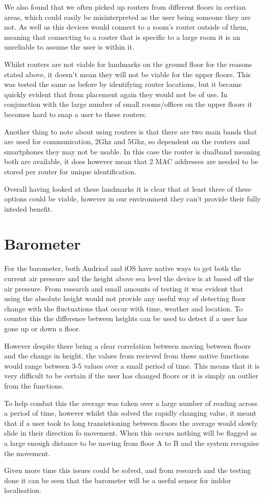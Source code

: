 \documentclass[main.tex]{subfiles}
\begin{document}
We also found that we often picked up routers from different floors in certian areas, which could easily be misinterpreted as the user being someone they are not. As well as this devices would connect to a room's router outside of them, meaning that connecting to a router that is specific to a large room it is an unreliable to assume the user is within it.

Whilst routers are not viable for landmarks on the ground floor for the reasons stated above, it doesn't mean they will not be viable for the upper floors. This was tested the same as before by identifying router locations, but it became quickly evident that from placement again they would not be of use. In conjunction with the large number of small rooms/offices on the upper floors it becomes hard to snap a user to these routers.

Another thing to note about using routers is that there are two main bands that are used for communication, 2Ghz and 5Ghz, so dependent on the routers and smartphones they may not be usable. In this case the router is dualband meaning both are available, it does however mean that 2 MAC addresses are needed to be stored per router for unique identification.

Overall having looked at these landmarks it is clear that at least three of these options could be viable, however in our environment they can't provide their fully inteded benefit.

\section{Barometer}

For the barometer, both Andriod and iOS have native ways to get both the current air pressure and the height above sea level the device is at based off the air pressure. From research and small amounts of testing it was evident that using the absolute height would not provide any useful way of detecting floor change with the fluctuations that occur with time, weather and location. To counter this the difference between heights can be used to detect if a user has gone up or down a floor. 

However despite there being a clear correlation between moving between floors and the change in height, the values from recieved from these native functions would range between 3-5 values over a small period of time. This means that it is very difficult to be certain if the user has changed floors or it is simply an outlier from the functions. 

To help combat this the average was taken over a large number of reading across a period of time, however whilst this solved the rapidly changing value, it meant that if a user took to long transistioning between floors the average would slowly slide in their direction fo movement. When this occurs nothing will be flagged as a large enough distance to be moving from floor A to B and the system recognise the movement. 

Given more time this issues could be solved, and from research and the testing done it can be seen that the barometer will be a useful sensor for inddor localisation.
\end{document}
